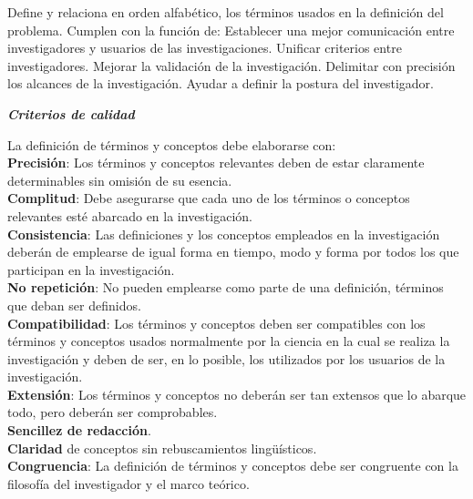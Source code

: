     Define y relaciona en orden alfabético, los términos usados en la definición del problema. Cumplen con la función de:
    Establecer una mejor comunicación entre investigadores y usuarios de las investigaciones.
    Unificar criterios entre investigadores.
    Mejorar la validación de la investigación.
    Delimitar con precisión los alcances de la investigación.
    Ayudar a definir la postura del investigador.
    
    \textbf{\textit{Criterios de calidad}}
    
    La definición de términos y conceptos debe elaborarse con:\\
    \textbf{Precisión}: Los términos y conceptos relevantes deben de estar claramente determinables sin omisión de su esencia.\\
    \textbf{Complitud}: Debe asegurarse que cada uno de los términos o conceptos relevantes esté abarcado en la investigación.\\
    \textbf{Consistencia}: Las definiciones y los conceptos empleados en la investigación deberán de emplearse de igual forma en tiempo, modo y forma por todos los que participan en la investigación.\\
    \textbf{No repetición}: No pueden emplearse como parte de una definición, términos que deban ser definidos.\\
    \textbf{Compatibilidad}: Los términos y conceptos deben ser compatibles con los términos y conceptos usados normalmente por la ciencia en la cual se realiza la investigación y deben de ser, en lo posible, los utilizados por los usuarios de la investigación.\\
    \textbf{Extensión}: Los términos y conceptos no deberán ser tan extensos que lo abarque todo, pero deberán ser comprobables.\\
    \textbf{Sencillez de redacción}.\\
    \textbf{Claridad} de conceptos sin rebuscamientos lingüísticos.\\
    \textbf{Congruencia}: La definición de términos y conceptos debe ser congruente con la filosofía del investigador y el marco teórico.